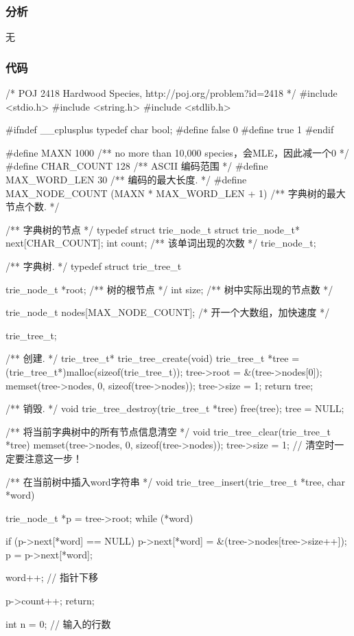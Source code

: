 \subsubsection{分析}
无


\subsubsection{代码}
\begin{Codex}[label=hardwood_species.c]
/* POJ 2418 Hardwood Species, http://poj.org/problem?id=2418 */
#include <stdio.h>
#include <string.h>
#include <stdlib.h>

#ifndef __cplusplus
typedef char bool;
#define false 0
#define true 1
#endif

#define MAXN 1000   /**  no more than 10,000 species，会MLE，因此减一个0 */
#define CHAR_COUNT  128 /** ASCII 编码范围 */
#define MAX_WORD_LEN 30 /** 编码的最大长度. */
#define MAX_NODE_COUNT  (MAXN * MAX_WORD_LEN + 1)  /** 字典树的最大节点个数. */


/** 字典树的节点 */
typedef struct trie_node_t {
    struct trie_node_t* next[CHAR_COUNT];
    int count;  /** 该单词出现的次数 */
} trie_node_t;

/** 字典树. */
typedef struct trie_tree_t {
    trie_node_t *root; /** 树的根节点 */
    int size; /** 树中实际出现的节点数 */

    trie_node_t nodes[MAX_NODE_COUNT]; /* 开一个大数组，加快速度 */
} trie_tree_t;

/** 创建. */
trie_tree_t* trie_tree_create(void) {
    trie_tree_t *tree = (trie_tree_t*)malloc(sizeof(trie_tree_t));
    tree->root = &(tree->nodes[0]);
    memset(tree->nodes, 0, sizeof(tree->nodes));
    tree->size = 1;
    return tree;
}

/** 销毁. */
void trie_tree_destroy(trie_tree_t *tree) {
    free(tree);
    tree = NULL;
}

/** 将当前字典树中的所有节点信息清空 */
void trie_tree_clear(trie_tree_t *tree) {
    memset(tree->nodes, 0, sizeof(tree->nodes));
    tree->size = 1; // 清空时一定要注意这一步！
}

/** 在当前树中插入word字符串 */
void trie_tree_insert(trie_tree_t *tree, char *word) {
    trie_node_t *p = tree->root;
    while (*word) {
        if (p->next[*word] == NULL) {
            p->next[*word] = &(tree->nodes[tree->size++]);
        }
        p = p->next[*word];

        word++; // 指针下移
    }
    p->count++;
    return;
}


int n = 0;  // 输入的行数


\end{Codex}
